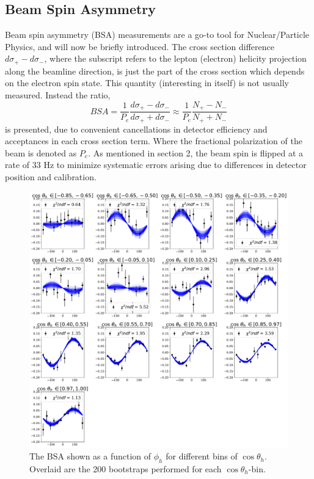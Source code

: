 \subsection{Beam Spin Asymmetry}
Beam spin asymmetry (BSA) measurements are a go-to tool for Nuclear/Particle Physics, and will now be briefly introduced.  The cross section difference $d\sigma_{+} - d\sigma_{-}$, where the subscript refers to the lepton (electron) helicity projection along the beamline direction, is just the part of the cross section which depends on the electron spin state.  This quantity (interesting in itself) is not usually measured.  Instead the ratio,
\begin{equation}
	BSA = \frac{1}{P_e} \frac{d\sigma_{+} - d\sigma_{-}}{d\sigma_{+} + d\sigma_{-}} \approx \frac{1}{P_e} \frac{N_+ - N_-}{N_+ + N_-}
\end{equation}    
is presented, due to convenient cancellations in detector efficiency and acceptances in each cross section term.  Where the fractional polarization of the beam is denoted as $P_e$.  As mentioned in section 2, the beam spin is flipped at a rate of 33 Hz to minimize systematic errors arising due to differences in detector position and calibration.  
\\

\begin{figure}
  \begin{center}
    \includegraphics[width=14cm]{image/default_phi_bootstraps.pdf}
    \caption{The BSA shown as a function of $\phi_h$ for different bins of $\cos \theta_h$.  Overlaid are the 200 bootstraps performed for each $\cos \theta_h$-bin.}
  \end{center}
\end{figure}

